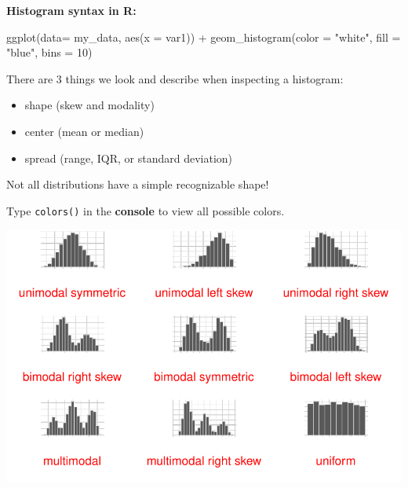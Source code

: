 \documentclass[
  letterpaper,
  DIV=11,
  numbers=noendperiod]{scrreprt}
\newenvironment{Shaded}{\begin{snugshade}}{\end{snugshade}}
\newcommand{\AttributeTok}[1]{\textcolor[rgb]{0.40,0.45,0.13}{#1}}
\newcommand{\DecValTok}[1]{\textcolor[rgb]{0.68,0.00,0.00}{#1}}
\newcommand{\FunctionTok}[1]{\textcolor[rgb]{0.28,0.35,0.67}{#1}}
\newcommand{\NormalTok}[1]{\textcolor[rgb]{0.00,0.23,0.31}{#1}}
\newcommand{\SpecialCharTok}[1]{\textcolor[rgb]{0.37,0.37,0.37}{#1}}
\newcommand{\StringTok}[1]{\textcolor[rgb]{0.13,0.47,0.30}{#1}}
\providecommand{\tightlist}{%
  \setlength{\itemsep}{0pt}\setlength{\parskip}{0pt}}\usepackage{longtable,booktabs,array}
\begin{document}
\begin{tcolorbox}[enhanced jigsaw, breakable, colback=white, bottomrule=.15mm, leftrule=.75mm, colframe=quarto-callout-note-color-frame, arc=.35mm, rightrule=.15mm, toprule=.15mm, left=2mm, opacityback=0]

\textbf{Histogram syntax in R:}

\begin{Shaded}
\begin{Highlighting}[]
\FunctionTok{ggplot}\NormalTok{(}\AttributeTok{data=}\NormalTok{ my\_data, }\FunctionTok{aes}\NormalTok{(}\AttributeTok{x =}\NormalTok{ var1)) }\SpecialCharTok{+}
  \FunctionTok{geom\_histogram}\NormalTok{(}\AttributeTok{color =} \StringTok{"white"}\NormalTok{, }\AttributeTok{fill =} \StringTok{"blue"}\NormalTok{, }\AttributeTok{bins =} \DecValTok{10}\NormalTok{)}
\end{Highlighting}
\end{Shaded}

There are 3 things we look and describe when inspecting a histogram:

\begin{itemize}
\tightlist
\item
  shape (skew and modality)
\item
  center (mean or median)
\item
  spread (range, IQR, or standard deviation)
\end{itemize}

Not all distributions have a simple recognizable shape!

Type \texttt{colors()} in the \textbf{console} to view all possible
colors.

\end{tcolorbox}

\begin{tcolorbox}[enhanced jigsaw, breakable, colback=white, bottomrule=.15mm, leftrule=.75mm, colframe=quarto-callout-note-color-frame, arc=.35mm, rightrule=.15mm, toprule=.15mm, left=2mm, opacityback=0]

\includegraphics{04-content_files/figure-pdf/unnamed-chunk-2-1.pdf}

\end{tcolorbox}
\end{document}

